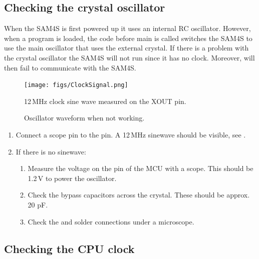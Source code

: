 \subsection{Checking the crystal oscillator}
\label{checking-the-crystal-oscillator}

When the SAM4S is first powered up it uses an internal RC oscillator.
However, when a program is loaded, the code before main is called
switches the SAM4S to use the main oscillator that uses the external
crystal.  If there is a problem with the crystal oscillator the SAM4S
will not run since it has no clock.  Moreover,  will
then fail to communicate with the SAM4S.

\begin{figure}[!h]
\centering
\texttt{[image: figs/ClockSignal.png]}
\caption{12\,MHz clock sine wave measured on the XOUT pin.}
\label{fig:xout}
\end{figure}

\begin{figure}[!h]
  \centering
  \caption{Oscillator waveform when not working.}
\end{figure}

\begin{enumerate}
\item Connect a scope pin to the  pin. A 12\,MHz sinewave
  should be visible, see .

\item If there is no sinewave:

  \begin{enumerate}
  \item Measure the voltage on the  pin of the MCU with a
    scope. This should be 1.2\,V to power the oscillator.

  \item Check the bypass capacitors across the crystal.  These should
    be approx. 20 pF.

  \item Check the  and  solder connections under a
    microscope.
  \end{enumerate}
\end{enumerate}


\subsection{Checking the CPU clock}
\label{checking-the-clock}


